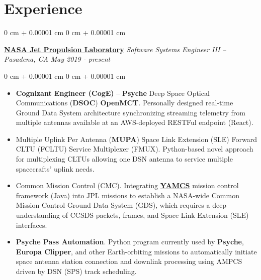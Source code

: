 \documentclass[10pt, letterpaper]{article}
\newenvironment{highlights}{
    \begin{itemize}[
        topsep=0.10 cm,
        parsep=0.10 cm,
        partopsep=0pt,
        itemsep=0pt,
        leftmargin=0 cm + 10pt
    ]
}{
    \end{itemize}
} %
\newenvironment{onecolentry}{
    \begin{adjustwidth}{
        0 cm + 0.00001 cm
    }{
        0 cm + 0.00001 cm
    }
}{
    \end{adjustwidth}
} %
\newenvironment{twocolentry}[2][]{
    \onecolentry
    \def\secondColumn{#2}
    \setcolumnwidth{\fill, 4.5 cm}
    \begin{paracol}{2}
}{
    \switchcolumn \raggedleft \secondColumn
    \end{paracol}
    \endonecolentry
} %
\begin{document}
    
    \section{Experience}



        
        \begin{twocolentry}{
            \textit{\small May 2019 - present}
        }
            \href{https://www.jpl.nasa.gov/}{\textbf{\large NASA Jet Propulsion Laboratory}} \textit{\small Software Systems Engineer III -- Pasadena, CA}\end{twocolentry}

        \vspace{0.10 cm}
        \begin{onecolentry}
            \begin{highlights}
                \item \textbf{Cognizant Engineer (CogE)} -- \textbf{Psyche} Deep Space Optical Communications (\textbf{DSOC}) \textbf{OpenMCT}. Personally designed real-time Ground Data System architecture synchronizing streaming telemetry from multiple antennas available at an AWS-deployed RESTFul endpoint (React).
                \item Multiple Uplink Per Antenna (\textbf{MUPA}) Space Link Extension (SLE) Forward CLTU (FCLTU) Service Multiplexer (FMUX). Python-based novel approach for multiplexing CLTUs allowing one DSN antenna to service multiple spacecrafts' uplink needs.  
                \item Common Mission Control (CMC). Integrating \href{https://github.com/yamcs/yamcs}{\textbf{YAMCS}} mission control framework (Java) into JPL missions to establish a NASA-wide Common Mission Control Ground Data System (GDS), which requires a deep understanding of CCSDS packets, frames, and Space Link Extension (SLE) interfaces.
                \item \textbf{Psyche Pass Automation}. Python program currently used by \textbf{Psyche}, \textbf{Europa Clipper}, and other Earth-orbiting missions to automatically initiate space antenna station connection and downlink processing using AMPCS driven by DSN (SPS) track scheduling.


\end{highlights}
\end{onecolentry}
\end{document}
